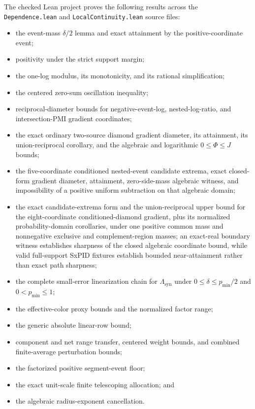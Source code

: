 \documentclass[11pt]{article}
\theoremstyle{definition}
\begin{document}
The checked Lean project proves the following results across the
\texttt{Dependence.lean} and \texttt{LocalContinuity.lean} source files:
\begin{itemize}[leftmargin=*,nosep]
  \item the event-mass $\delta/2$ lemma and exact attainment by the positive-coordinate event;
  \item positivity under the strict support margin;
  \item the one-log modulus, its monotonicity, and its rational simplification;
  \item the centered zero-sum oscillation inequality;
  \item reciprocal-diameter bounds for negative-event-log, nested-log-ratio, and intersection-PMI
    gradient coordinates;
  \item the exact ordinary two-source diamond gradient diameter, its attainment, its
    union-reciprocal corollary, and the algebraic and logarithmic $0\le\Phi\le J$ bounds;
  \item the five-coordinate conditioned nested-event candidate extrema, exact closed-form
    gradient diameter, attainment, zero-side-mass algebraic witness, and impossibility of a
    positive uniform subtraction on that algebraic domain;
  \item the exact candidate-extrema form and the union-reciprocal upper bound for the
    eight-coordinate conditioned-diamond gradient, plus its normalized probability-domain
    corollaries, under one positive common mass and nonnegative exclusive and complement-region
    masses; an exact-real boundary witness establishes sharpness of the closed algebraic coordinate
    bound, while valid full-support SxPID fixtures establish bounded near-attainment rather than
    exact path sharpness;
  \item the complete small-error linearization chain for $\Lambda_{\mathrm{syn}}$ under
    $0\le\delta\le p_{\min}/2$ and $0<p_{\min}\le1$;
  \item the effective-color proxy bounds and the normalized factor range;
  \item the generic absolute linear-row bound;
  \item component and net range transfer, centered weight bounds, and combined finite-average
    perturbation bounds;
  \item the factorized positive segment-event floor;
  \item the exact unit-scale finite telescoping allocation; and
  \item the algebraic radius-exponent cancellation.
\end{itemize}
\end{document}
